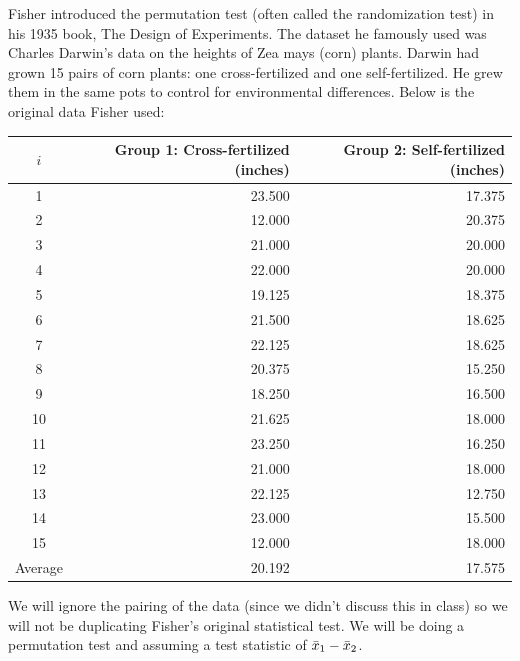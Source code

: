 \documentclass[12pt]{article}
\begin{document}
\problem Fisher introduced the permutation test (often called the randomization test) in his 1935 book, The Design of Experiments. The dataset he famously used was Charles Darwin’s data on the heights of Zea mays (corn) plants. Darwin had grown 15 pairs of corn plants: one cross-fertilized and one self-fertilized. He grew them in the same pots to control for environmental differences. Below is the original data Fisher used: %

\begin{table}[ht]
\centering
\begin{tabular}{crr}
\hline
$i$ & Group 1: Cross-fertilized (inches) & Group 2: Self-fertilized (inches) \\
\hline
1 & 23.500 & 17.375 \\
2 & 12.000 & 20.375 \\
3 & 21.000 & 20.000 \\
4 & 22.000 & 20.000 \\
5 & 19.125 & 18.375 \\
6 & 21.500 & 18.625 \\
7 & 22.125 & 18.625 \\
8 & 20.375 & 15.250 \\
9 & 18.250 & 16.500 \\
10 & 21.625 & 18.000 \\
11 & 23.250 & 16.250 \\
12 & 21.000 & 18.000 \\
13 & 22.125 & 12.750 \\
14 & 23.000 & 15.500 \\
15 & 12.000 & 18.000 \\
\hline
Average &20.192 & 17.575 \\
\end{tabular}
\end{table}

\noindent We will ignore the pairing of the data (since we didn't discuss this in class) so we will not be duplicating Fisher's original statistical test. We will be doing a permutation test and assuming a test statistic of $\bar{x}_1 - \bar{x}_2$.
\end{document}
